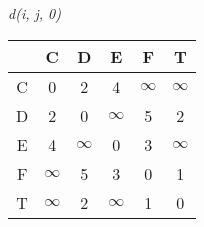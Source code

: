 \begin{frame}{\textit{d(i, j, 0)}}

\centering

\vspace{1em}

\begin{tabular}{c|ccccc}
     & C & D & E & F & T \\
    \hline
    C & 0 & 2 & 4 & $\infty$ & $\infty$ \\
    D & 2 & 0 & $\infty$ & 5 & 2 \\
    E & 4 & $\infty$ & 0 & 3 & $\infty$ \\
    F & $\infty$ & 5 & 3 & 0 & 1 \\
    T & $\infty$ & 2 & $\infty$ & 1 & 0 \\
\end{tabular}

\vspace{1em}
\vspace{1em}

\vspace{1em}
\end{frame}

